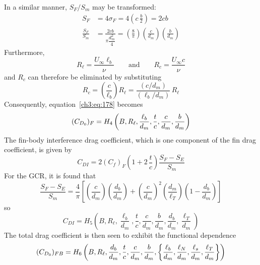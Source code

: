 In a similar manner, $S_F/S_m$ may be transformed:
\begin{align}
S_F &= 4\sigma_F = 4\left(c\,\frac{b}{2}\right) = 2cb \label{ch3:eq:189}\\
\frac{S_F}{S_m} &= \frac{2cb}{\pi\dfrac{d_m^2}{4}}
  = \left(\frac{8}{\pi}\right)\left(\frac{c}{d_m}\right)\left(\frac{b}{d_m}\right)
  \label{ch3:eq:190}
\end{align}
Furthermore,
\begin{equation}\label{ch3:eq:191}
R_\ell = \frac{U_\infty\ell_b}{\nu} \qquad\text{and}\qquad R_c = \frac{U_\infty c}{\nu}
\end{equation}
and $R_c$ can therefore be eliminated by substituting
\begin{equation}\label{ch3:eq:192}
R_c = \left(\frac{c}{\ell_b}\right)R_\ell = \frac{(c/d_m)}{(\ell_b/d_m)}\,R_\ell
\end{equation}
Consequently, equation~\eqref{ch3:eq:178} becomes
\begin{equation}\label{ch3:eq:193}
(C_{D_0})_F = H_4\left(B, R_\ell, \frac{\ell_b}{d_m}, \frac{t}{c}, \frac{c}{d_m}, \frac{b}{d_m}\right)
\end{equation}
The fin-body interference drag coefficient, which is one component of the fin drag coefficient, is
given by
\begin{equation}\label{ch3:eq:194}
C_{DI} = 2(C_f)_F\left(1 + 2\,\frac{t}{c}\right)\frac{S_F - S_E}{S_m}
\end{equation}
For the GCR, it is found that
\begin{equation}\label{ch3:eq:195}
\frac{S_F - S_E}{S_m} = \frac{4}{\pi}\left[\left(\frac{c}{d_m}\right)\left(\frac{d_b}{d_m}\right)
  + \left(\frac{c}{d_m}\right)^2\left(\frac{d_m}{\ell_T}\right)\left(1 - \frac{d_b}{d_m}\right)\right]
\end{equation}
so
\begin{equation}\label{ch3:eq:196}
C_{DI} = H_5\left(B, R_\ell, \frac{\ell_b}{d_m}, \frac{t}{c}, \frac{c}{d_m}, \frac{b}{d_m},
  \frac{d_b}{d_m}, \frac{\ell_T}{d_m}\right)
\end{equation}
The total drag coefficient is then seen to exhibit the functional dependence
\begin{equation}\label{ch3:eq:197}
(C_{D_0})_{FB} = H_6\left(B, R_\ell, \frac{d_b}{d_m}, \frac{t}{c}, \frac{c}{d_m}, \frac{b}{d_m},
  \left\{\frac{\ell_b}{d_m}, \frac{\ell_N}{d_m}, \frac{\ell_s}{d_m}, \frac{\ell_T}{d_m}\right\}\right)
\end{equation}

